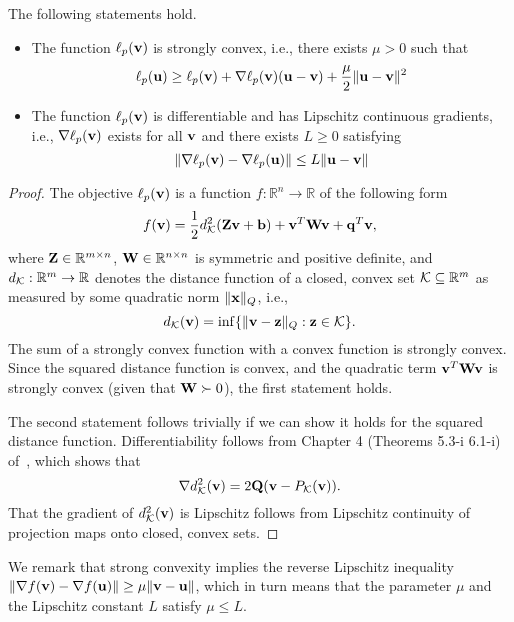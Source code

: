 \begin{lemma}\label{lem:PropertiesOfObj}
  The following statements hold.
  \begin{itemize}
    \item The function $\ell_p({\mathbf{{\mathbf{v}}}})$ is strongly convex, i.e., there exists $\mu >0$
      such that 
      \[
        \ell_p({\mathbf{{\mathbf{u}}}}) \ge \ell_p({\mathbf{{\mathbf{v}}}}) + \nabla \ell_p({\mathbf{{\mathbf{v}}}})({\mathbf{u}}-{\mathbf{v}}) + \frac{\mu}{2} \|{\mathbf{u}}-{\mathbf{v}}\|^2
      \]
    \item The function $\ell_p({\mathbf{{\mathbf{v}}}})$ is differentiable and has Lipschitz continuous gradients, i.e.,
      $\nabla \ell_p({\mathbf{{\mathbf{v}}}})$ exists for all ${\mathbf{v}}$ and there exists $L \ge 0$ satisfying
      \[
      \|\nabla \ell_p({\mathbf{{\mathbf{v}}}}) - \nabla \ell_p({\mathbf{{\mathbf{u}}}})\| \le L \|{\mathbf{u}} - {\mathbf{v}}\|
      \]
  \end{itemize}
  \begin{proof}

The objective $\ell_p({\mathbf{{\mathbf{v}}}})$ is a function $f : \mathbb{R}^n \rightarrow \mathbb{R}$
of the following form
\[
  f({\mathbf{v}}) = \frac{1}{2}d_{\mathcal{K}}^2({\mathbf{Z}}{\mathbf{v}} + {\mathbf{b}}) + {\mathbf{v}}^{T}{\mathbf{W}}{\mathbf{v}} + {\mathbf{q}}^T {\mathbf{v}},
\]
where ${\mathbf{Z}} \in \mathbb{R}^{m \times n}$, ${\mathbf{W}} \in \mathbb{R}^{n \times n}$ is
symmetric and positive definite, and $d_{\mathcal{K}} : \mathbb{R}^{m} \rightarrow \mathbb{R}$ 
denotes the distance function of a closed, convex set $\mathcal{K} \subseteq \mathbb{R}^m$
as measured by some quadratic norm $\|{\mathbf{x}}\|_Q$, i.e.,
\[
  d_{\mathcal{K}}({\mathbf{v}}) = \inf \{ \|{\mathbf{v}}-{\mathbf{z}}\|_Q : {\mathbf{z}} \in \mathcal{K}\}.
\]
    The sum of a strongly convex function with a convex function is strongly
    convex.  Since the squared distance function is convex, and the quadratic
    term ${\mathbf{v}}^T {\mathbf{W}}{\mathbf{v}}$ is strongly convex (given that ${\mathbf{W}} \succ 0$), the  first
    statement holds.

    The second statement follows trivially if we can show it holds 
    for the squared distance function. 
    Differentiability follows from Chapter 4 (Theorems 5.3-i 6.1-i) of~\cite{bib:delfour2011shapes},
    which shows that
  \[
    \nabla d_{\mathcal{K}}^2({\mathbf{v}}) = 2 {\mathbf{Q}} ({\mathbf{v}} - P_{\mathcal{K}}({\mathbf{v}})).
  \]
    That the gradient of $d_{\mathcal{K}}^2({\mathbf{v}})$ is Lipschitz follows
    from Lipschitz continuity of projection maps onto closed, convex sets.
  \end{proof}
\end{lemma}
\noindent We remark that strong convexity implies the reverse
Lipschitz inequality $\|\nabla f({\mathbf{v}}) - \nabla f({\mathbf{u}})\| \ge \mu \|{\mathbf{v}} - {\mathbf{u}}\|$,
which in turn means that the parameter $\mu$ and the Lipschitz constant $L$
satisfy $\mu \le L$.




